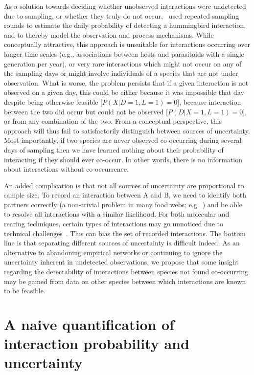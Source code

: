 \documentclass[12pt]{article}
\begin{document}
\begin{spacing}{2.0}
  As a solution towards deciding whether unobserved interactions were undetected due to sampling, or whether they truly do not occur,~\citet{Weinstein2017} used repeated sampling rounds to estimate the daily probability of detecting a hummingbird interaction, and to thereby model the observation and process mechanisms. While conceptually attractive, this approach is unsuitable for interactions occurring over longer time scales (e.g., associations between hosts and parasitoids with a single generation per year), or very rare interactions which might not occur on any of the sampling days or might involve individuals of a species that are not under observation. What is worse, the problem persists that if a given interaction is not observed on a given day, this could be either because it was impossible that day despite being otherwise feasible [$P(X|D=1,L=1)=0$], because interaction between the two did occur but could not be observed [$P(D|X=1,L=1)=0$], or from any combination of the two. From a conceptual perspective, this approach will thus fail to satisfactorily distinguish between sources of uncertainty. Most importantly, if two species are never observed co-occurring during several days of sampling then we have learned nothing about their probability of interacting if they should ever co-occur. In other words, there is no information about interactions without co-occurrence.


  An added complication is that not all sources of uncertainty are proportional to sample size. To record an interaction between A and B, we need to identify both partners correctly (a non-trivial problem in many food webs; e.g.~\citealp{Kaartinen2011,Roslin2016}) and be able to resolve all interactions with a similar likelihood. For both molecular and rearing techniques, certain types of interactions may go unnoticed due to technical challenges~\citep{Wirta2014}. This can bias the set of recorded interactions. The bottom line is that separating different sources of uncertainty is difficult indeed. As an alternative to abandoning empirical networks or continuing to ignore the uncertainty inherent in undetected observations, we propose that some insight regarding the detectability of interactions between species not found co-occurring may be gained from data on other species between which interactions are known to be feasible. 


\section*{A naive quantification of interaction probability and uncertainty}


\end{spacing}
\end{document}
